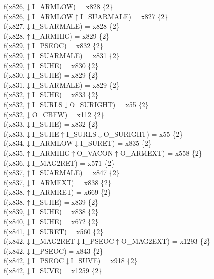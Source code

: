 f(x826,$\downarrow$I\_ARMLOW) = x828 \{2\} \\  
f(x826,$\downarrow$I\_ARMLOW$\uparrow$I\_SUARMALE) = x827 \{2\} \\  
f(x827,$\downarrow$I\_SUARMALE) = x828 \{2\} \\  
f(x828,$\uparrow$I\_ARMHIG) = x829 \{2\} \\  
f(x829,$\uparrow$I\_PSEOC) = x832 \{2\} \\  
f(x829,$\uparrow$I\_SUARMALE) = x831 \{2\} \\  
f(x829,$\uparrow$I\_SUHE) = x830 \{2\} \\  
f(x830,$\downarrow$I\_SUHE) = x829 \{2\} \\  
f(x831,$\downarrow$I\_SUARMALE) = x829 \{2\} \\  
f(x832,$\uparrow$I\_SUHE) = x833 \{2\} \\  
f(x832,$\uparrow$I\_SURLS$\downarrow$O\_SURIGHT) = x55 \{2\} \\  
f(x832,$\downarrow$O\_CBFW) = x112 \{2\} \\  
f(x833,$\downarrow$I\_SUHE) = x832 \{2\} \\  
f(x833,$\downarrow$I\_SUHE$\uparrow$I\_SURLS$\downarrow$O\_SURIGHT) = x55 \{2\} \\  
f(x834,$\downarrow$I\_ARMLOW$\downarrow$I\_SURET) = x835 \{2\} \\  
f(x835,$\uparrow$I\_ARMHIG$\uparrow$O\_VACON$\uparrow$O\_ARMEXT) = x558 \{2\} \\  
f(x836,$\downarrow$I\_MAG2RET) = x571 \{2\} \\  
f(x837,$\uparrow$I\_SUARMALE) = x847 \{2\} \\  
f(x837,$\downarrow$I\_ARMEXT) = x838 \{2\} \\  
f(x838,$\uparrow$I\_ARMRET) = x669 \{2\} \\  
f(x838,$\uparrow$I\_SUHE) = x839 \{2\} \\  
f(x839,$\downarrow$I\_SUHE) = x838 \{2\} \\  
f(x840,$\downarrow$I\_SUHE) = x672 \{2\} \\  
f(x841,$\downarrow$I\_SURET) = x560 \{2\} \\  
f(x842,$\downarrow$I\_MAG2RET$\downarrow$I\_PSEOC$\uparrow$O\_MAG2EXT) = x1293 \{2\} \\  
f(x842,$\downarrow$I\_PSEOC) = x843 \{2\} \\  
f(x842,$\downarrow$I\_PSEOC$\downarrow$I\_SUVE) = x918 \{2\} \\  
f(x842,$\downarrow$I\_SUVE) = x1259 \{2\} \\  
